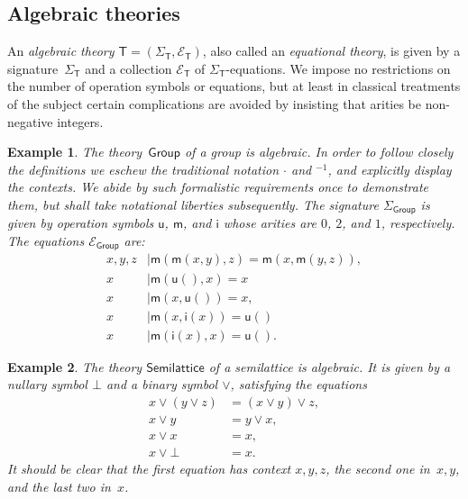 \documentclass{amsart}
\newcommand{\theory}[1]{\mathsf{#1}} %
\newcommand{\signature}[1]{\Sigma_{\theory{#1}}} %
\newcommand{\equations}[1]{\mathcal{E}_{\theory{#1}}} %
\newtheorem{example}{Example}[section]
\begin{document}
\subsection{Algebraic theories}
\label{sec:algebraic-theories-1}

An \emph{algebraic theory $\theory{T} = (\signature{T}, \equations{T})$}, also
called an \emph{equational theory}, is given by a signature~$\signature{T}$ and
a collection $\equations{T}$ of $\signature{T}$-equations.
%
We impose no restrictions on the number of operation symbols or equations, but at least in
classical treatments of the subject certain complications are avoided by insisting that
arities be non-negative integers.

\begin{example}
  \label{ex:theory-group}
  The theory~$\theory{Group}$ of a group is algebraic. In order to follow closely the
  definitions we eschew the traditional notation $\cdot$ and ${}^{-1}$, and explicitly
  display the contexts. We abide by such formalistic requirements once to demonstrate
  them, but shall take notational liberties subsequently.
  The signature $\signature{Group}$ is given by operation symbols $\mathsf{u}$,
  $\mathsf{m}$, and $\mathsf{i}$ whose arities are $0$, $2$, and $1$, respectively. The
  equations $\equations{Group}$ are:
  \begin{align*}
    x, y, z &\mid \mathsf{m}(\mathsf{m}(x, y), z) = \mathsf{m}(x, \mathsf{m}(y, z)),\\
    x &\mid \mathsf{m}(\mathsf{u}(), x) = x \\
    x &\mid \mathsf{m}(x, \mathsf{u}()) = x,\\
    x &\mid \mathsf{m}(x, \mathsf{i}(x)) = \mathsf{u}()\\
    x &\mid \mathsf{m}(\mathsf{i}(x), x) = \mathsf{u}().
  \end{align*}
\end{example}

\begin{example}
  \label{ex:semi-lattice}
  The theory $\theory{Semilattice}$ of a semilattice is algebraic. It is given by a
  nullary symbol $\bot$ and a binary symbol $\vee$, satisfying the equations
  \begin{align*}
    x \vee (y \vee z) &= (x \vee y) \vee z,\\
    x \vee y &= y \vee x,\\
    x \vee x &= x,\\
    x \vee \bot &= x.
  \end{align*}
  It should be clear that the first equation has context $x, y, z$, the second one
  in~$x, y$, and the last two in~$x$.
\end{example}
\end{document}
